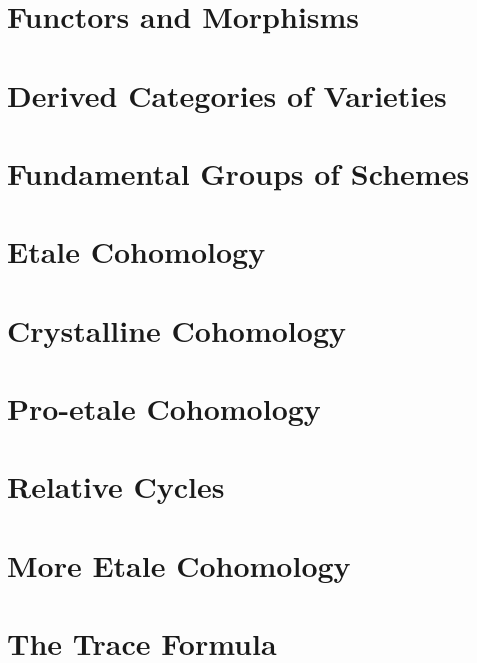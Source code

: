 \chapter{Functors and Morphisms}
\label{chap:functors}


\chapter{Derived Categories of Varieties}
\label{chap:equiv}


\chapter{Fundamental Groups of Schemes}
\label{chap:pione}


\chapter{Etale Cohomology}
\label{chap:etale-cohomology}


\chapter{Crystalline Cohomology}
\label{chap:crystalline}


\chapter{Pro-etale Cohomology}
\label{chap:proetale}


\chapter{Relative Cycles}
\label{chap:relative-cycles}


\chapter{More Etale Cohomology}
\label{chap:more-etale}


\chapter{The Trace Formula}
\label{chap:trace}

